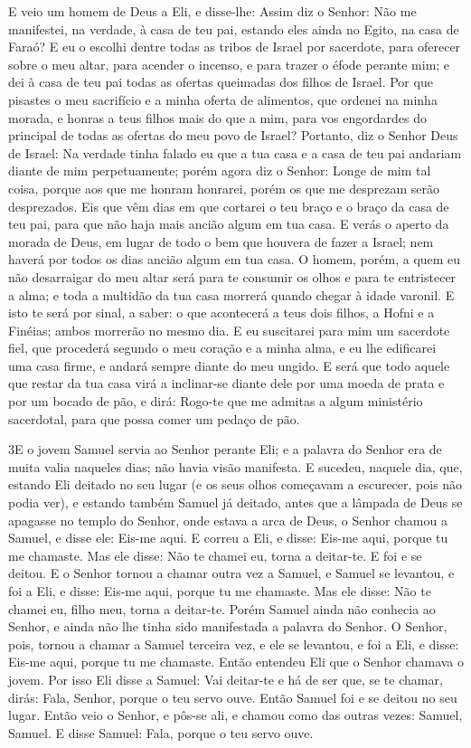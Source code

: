 E veio um homem de Deus a Eli, e disse-lhe: Assim diz o Senhor:
Não me manifestei, na verdade, à casa de teu pai, estando eles ainda
no Egito, na casa de Faraó? E eu o escolhi dentre todas as
tribos de Israel por sacerdote, para oferecer sobre o meu altar,
para acender o incenso, e para trazer o éfode perante mim; e dei à
casa de teu pai todas as ofertas queimadas dos filhos de Israel.
Por que pisastes o meu sacrifício e a minha oferta de
alimentos, que ordenei na minha morada, e honras a teus filhos mais
do que a mim, para vos engordardes do principal de todas as ofertas
do meu povo de Israel? Portanto, diz o Senhor Deus de Israel:
Na verdade tinha falado eu que a tua casa e a casa de teu pai
andariam diante de mim perpetuamente; porém agora diz o Senhor:
Longe de mim tal coisa, porque aos que me honram honrarei, porém os
que me desprezam serão desprezados. Eis que vêm dias em que
cortarei o teu braço e o braço da casa de teu pai, para que não haja
mais ancião algum em tua casa. E verás o aperto da morada de
Deus, em lugar de todo o bem que houvera de fazer a Israel; nem
haverá por todos os dias ancião algum em tua casa. O homem,
porém, a quem eu não desarraigar do meu altar será para te consumir
os olhos e para te entristecer a alma; e toda a multidão da tua casa
morrerá quando chegar à idade varonil. E isto te será por
sinal, a saber: o que acontecerá a teus dois filhos, a Hofni e a
Finéias; ambos morrerão no mesmo dia. E eu suscitarei para
mim um sacerdote fiel, que procederá segundo o meu coração e a minha
alma, e eu lhe edificarei uma casa firme, e andará sempre diante do
meu ungido. E será que todo aquele que restar da tua casa
virá a inclinar-se diante dele por uma moeda de prata e por um
bocado de pão, e dirá: Rogo-te que me admitas a algum ministério
sacerdotal, para que possa comer um pedaço de pão.

\medskip

\lettrine{3} E o jovem Samuel servia ao Senhor perante Eli; e
a palavra do Senhor era de muita valia naqueles dias; não havia
visão manifesta. E sucedeu, naquele dia, que, estando Eli
deitado no seu lugar (e os seus olhos começavam a escurecer, pois
não podia ver), e estando também Samuel já deitado, antes que a
lâmpada de Deus se apagasse no templo do Senhor, onde estava a arca
de Deus, o Senhor chamou a Samuel, e disse ele: Eis-me aqui.
E correu a Eli, e disse: Eis-me aqui, porque tu me chamaste. Mas
ele disse: Não te chamei eu, torna a deitar-te. E foi e se deitou.
E o Senhor tornou a chamar outra vez a Samuel, e Samuel se
levantou, e foi a Eli, e disse: Eis-me aqui, porque tu me chamaste.
Mas ele disse: Não te chamei eu, filho meu, torna a deitar-te.
Porém Samuel ainda não conhecia ao Senhor, e ainda não lhe tinha
sido manifestada a palavra do Senhor. O Senhor, pois, tornou a
chamar a Samuel terceira vez, e ele se levantou, e foi a Eli, e
disse: Eis-me aqui, porque tu me chamaste. Então entendeu Eli que o
Senhor chamava o jovem. Por isso Eli disse a Samuel: Vai
deitar-te e há de ser que, se te chamar, dirás: Fala, Senhor, porque
o teu servo ouve. Então Samuel foi e se deitou no seu lugar.
Então veio o Senhor, e pôs-se ali, e chamou como das outras
vezes: Samuel, Samuel. E disse Samuel: Fala, porque o teu servo
ouve.

